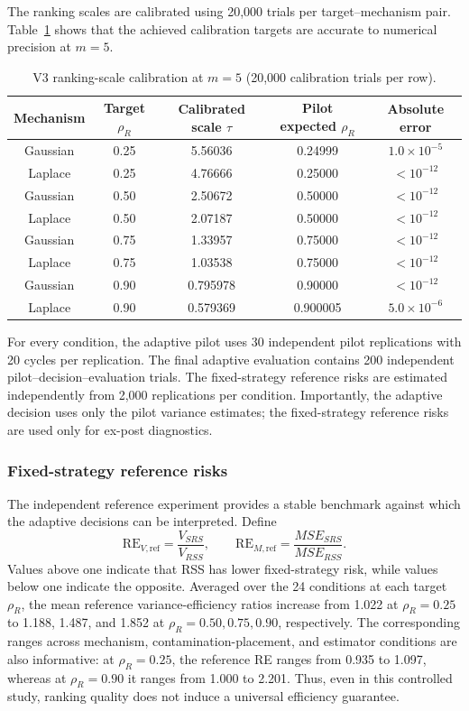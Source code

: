 \documentclass[12pt]{article}
\begin{document}
The ranking scales are calibrated using 20,000 trials per target--mechanism pair. Table~\ref{tab:v3_calibration} shows that the achieved calibration targets are accurate to numerical precision at $m=5$.

\begin{table}[htbp]
\centering
\caption{V3 ranking-scale calibration at $m=5$ (20,000 calibration trials per row).}
\label{tab:v3_calibration}
\begin{tabular}{ccccc}
\toprule
Mechanism & Target $\rho_R$ & Calibrated scale $\tau$ & Pilot expected $\rho_R$ & Absolute error \\
\midrule
Gaussian & 0.25 & 5.56036 & 0.24999 & $1.0\times10^{-5}$ \\
Laplace  & 0.25 & 4.76666 & 0.25000 & $<10^{-12}$ \\
Gaussian & 0.50 & 2.50672 & 0.50000 & $<10^{-12}$ \\
Laplace  & 0.50 & 2.07187 & 0.50000 & $<10^{-12}$ \\
Gaussian & 0.75 & 1.33957 & 0.75000 & $<10^{-12}$ \\
Laplace  & 0.75 & 1.03538 & 0.75000 & $<10^{-12}$ \\
Gaussian & 0.90 & 0.795978 & 0.90000 & $<10^{-12}$ \\
Laplace  & 0.90 & 0.579369 & 0.900005 & $5.0\times10^{-6}$ \\
\bottomrule
\end{tabular}
\end{table}

For every condition, the adaptive pilot uses 30 independent pilot replications with 20 cycles per replication. The final adaptive evaluation contains 200 independent pilot--decision--evaluation trials. The fixed-strategy reference risks are estimated independently from 2,000 replications per condition. Importantly, the adaptive decision uses only the pilot variance estimates; the fixed-strategy reference risks are used only for ex-post diagnostics.

\subsubsection{Fixed-strategy reference risks}
The independent reference experiment provides a stable benchmark against which the adaptive decisions can be interpreted. Define
\[
\mathrm{RE}_{V,\mathrm{ref}}=\frac{V_{SRS}}{V_{RSS}},
\qquad
\mathrm{RE}_{M,\mathrm{ref}}=\frac{MSE_{SRS}}{MSE_{RSS}}.
\]
Values above one indicate that RSS has lower fixed-strategy risk, while values below one indicate the opposite. Averaged over the 24 conditions at each target $\rho_R$, the mean reference variance-efficiency ratios increase from 1.022 at $\rho_R=0.25$ to 1.188, 1.487, and 1.852 at $\rho_R=0.50,0.75,0.90$, respectively. The corresponding ranges across mechanism, contamination-placement, and estimator conditions are also informative: at $\rho_R=0.25$, the reference RE ranges from 0.935 to 1.097, whereas at $\rho_R=0.90$ it ranges from 1.000 to 2.201. Thus, even in this controlled study, ranking quality does not induce a universal efficiency guarantee.
\end{document}
